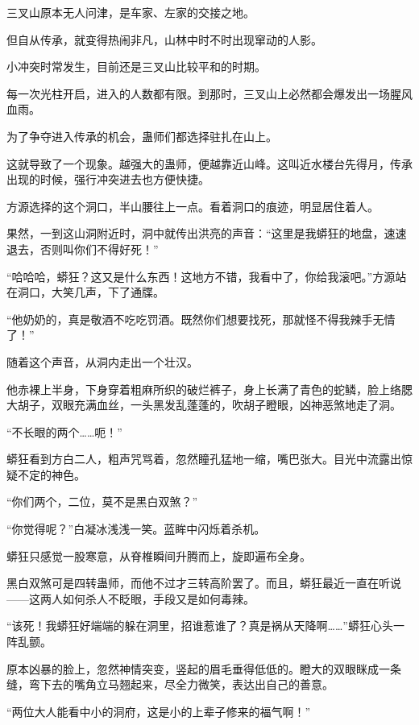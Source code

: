 
\begin{this_body}

三叉山原本无人问津，是车家、左家的交接之地。

但自从传承，就变得热闹非凡，山林中时不时出现窜动的人影。

小冲突时常发生，目前还是三叉山比较平和的时期。

每一次光柱开启，进入的人数都有限。到那时，三叉山上必然都会爆发出一场腥风血雨。

为了争夺进入传承的机会，蛊师们都选择驻扎在山上。

这就导致了一个现象。越强大的蛊师，便越靠近山峰。这叫近水楼台先得月，传承出现的时候，强行冲突进去也方便快捷。

方源选择的这个洞口，半山腰往上一点。看着洞口的痕迹，明显居住着人。

果然，一到这山洞附近时，洞中就传出洪亮的声音：“这里是我蟒狂的地盘，速速退去，否则叫你们不得好死！”

“哈哈哈，蟒狂？这又是什么东西！这地方不错，我看中了，你给我滚吧。”方源站在洞口，大笑几声，下了通牒。

“他奶奶的，真是敬酒不吃吃罚酒。既然你们想要找死，那就怪不得我辣手无情了！”

随着这个声音，从洞内走出一个壮汉。

他赤裸上半身，下身穿着粗麻所织的破烂裤子，身上长满了青色的蛇鳞，脸上络腮大胡子，双眼充满血丝，一头黑发乱蓬蓬的，吹胡子瞪眼，凶神恶煞地走了洞。

“不长眼的两个……呃！”

蟒狂看到方白二人，粗声咒骂着，忽然瞳孔猛地一缩，嘴巴张大。目光中流露出惊疑不定的神色。

“你们两个，二位，莫不是黑白双煞？”

“你觉得呢？”白凝冰浅浅一笑。蓝眸中闪烁着杀机。

蟒狂只感觉一股寒意，从脊椎瞬间升腾而上，旋即遍布全身。

黑白双煞可是四转蛊师，而他不过才三转高阶罢了。而且，蟒狂最近一直在听说——这两人如何杀人不眨眼，手段又是如何毒辣。

“该死！我蟒狂好端端的躲在洞里，招谁惹谁了？真是祸从天降啊……”蟒狂心头一阵乱颤。

原本凶暴的脸上，忽然神情突变，竖起的眉毛垂得低低的。瞪大的双眼眯成一条缝，弯下去的嘴角立马翘起来，尽全力微笑，表达出自己的善意。

“两位大人能看中小的洞府，这是小的上辈子修来的福气啊！”


\end{this_body}
